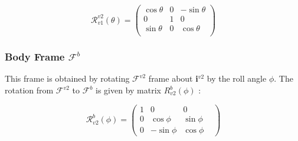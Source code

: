 \begin{equation*}
    \mathcal{R}^{v2}_{v1}(\theta) = \begin{pmatrix}
        \cos\theta & 0 & -\sin\theta\\
        0 & 1 & 0\\
        \sin\theta & 0 &\cos\theta\\
    \end{pmatrix}
\end{equation*}
 
\subsubsection{Body Frame \texorpdfstring{$\mathcal{F}^b$}{Body Frame}}

This frame is obtained by rotating $\mathcal{F}^{v2}$ frame about \textbf{i}$^{v2}$ by the roll angle $\phi$. The rotation from $\mathcal{F}^{v2}$ to $\mathcal{F}^{b}$ is given by matrix ${R}^{b}_{v2}(\phi)$ \cite{beard2012small}:

\begin{equation*}
    \mathcal{R}^{b}_{v2}(\phi) = \begin{pmatrix}
        1 & 0 & 0\\
        0 & \cos\phi & \sin\phi &\\
        0 & -\sin\phi & \cos\phi
    \end{pmatrix}
\end{equation*}

